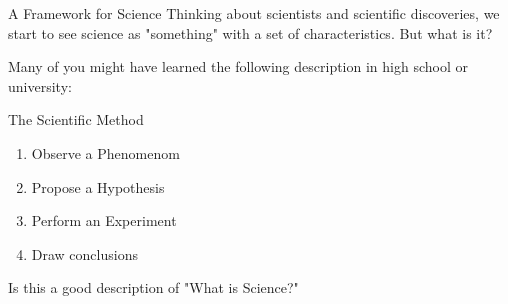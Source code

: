 \begin{frame}{A Framework for Science}{}
  Thinking about scientists and scientific discoveries, we start to see science as "something" with a set of characteristics. But what is it?\bigskip

  Many of you might have learned the following description in high school or university:

  \begin{block}{The Scientific Method}
    \begin{enumerate}
      \item Observe a Phenomenom
      \item Propose a Hypothesis
      \item Perform an Experiment
      \item Draw conclusions
    \end{enumerate}
  \end{block}\bigskip

  Is this a good description of "What is Science?"
\end{frame}


